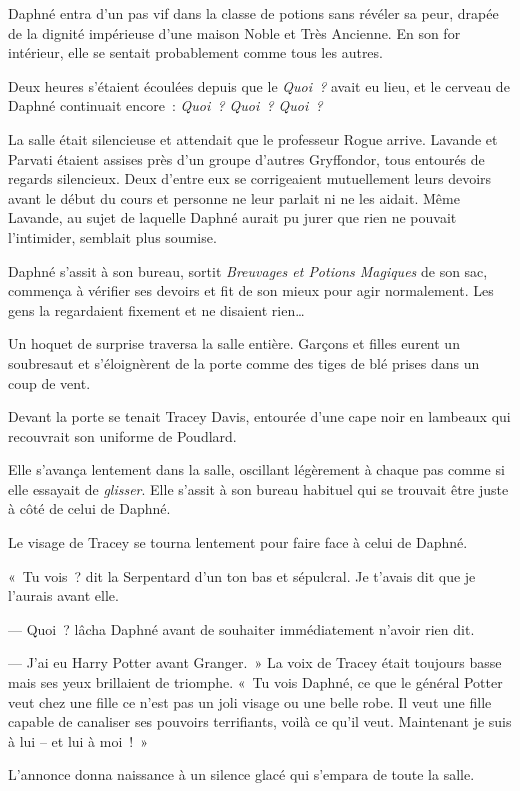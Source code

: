 Daphné entra d'un pas vif dans la classe de potions sans révéler sa peur, drapée de la dignité impérieuse d'une maison Noble et Très Ancienne.
En son for intérieur, elle se sentait probablement comme tous les autres.

Deux heures s'étaient écoulées depuis que le \emph{Quoi~?} avait eu lieu, et le cerveau de Daphné continuait encore~: \emph{Quoi~?
Quoi~? Quoi~?}

La salle était silencieuse et attendait que le professeur Rogue arrive.
Lavande et Parvati étaient assises près d'un groupe d'autres Gryffondor, tous entourés de regards silencieux.
Deux d'entre eux se corrigeaient mutuellement leurs devoirs avant le début du cours et personne ne leur parlait ni ne les aidait.
Même Lavande, au sujet de laquelle Daphné aurait pu jurer que rien ne pouvait l'intimider, semblait plus soumise.

Daphné s'assit à son bureau, sortit \emph{Breuvages et Potions Magiques} de son sac, commença à vérifier ses devoirs et fit de son mieux pour agir normalement.
Les gens la regardaient fixement et ne disaient rien…

Un hoquet de surprise traversa la salle entière.
Garçons et filles eurent un soubresaut et s'éloignèrent de la porte comme des tiges de blé prises dans un coup de vent.

Devant la porte se tenait Tracey Davis, entourée d'une cape noir en lambeaux qui recouvrait son uniforme de Poudlard.

Elle s'avança lentement dans la salle, oscillant légèrement à chaque pas comme si elle essayait de \emph{glisser}.
Elle s'assit à son bureau habituel qui se trouvait être juste à côté de celui de Daphné.

Le visage de Tracey se tourna lentement pour faire face à celui de Daphné.

«~Tu vois~? dit la Serpentard d'un ton bas et sépulcral.
Je t'avais dit que je l'aurais avant elle.

--- Quoi~? lâcha Daphné avant de souhaiter immédiatement n'avoir rien dit.

--- J'ai eu Harry Potter avant Granger.~»
La voix de Tracey était toujours basse mais ses yeux brillaient de triomphe.
«~Tu vois Daphné, ce que le général Potter veut chez une fille ce n'est pas un joli visage ou une belle robe.
Il veut une fille capable de canaliser ses pouvoirs terrifiants, voilà ce qu'il veut.
Maintenant je suis à lui -- et lui à moi~!~»

L'annonce donna naissance à un silence glacé qui s'empara de toute la salle.

